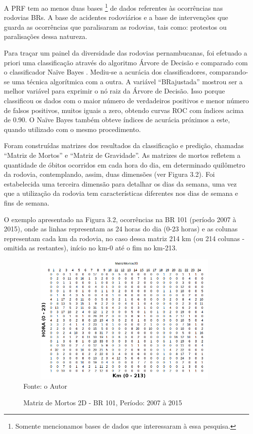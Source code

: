 A PRF tem ao menos duas bases \footnote{Somente mencionamos bases de dados que interessaram à essa pesquisa.} de dados referentes às ocorrências nas rodovias BRs. A base de acidentes rodoviários e a base de intervenções que guarda as ocorrências que paralisaram as rodovias, tais como: protestos ou paralisações dessa natureza.

Para traçar um painel da diversidade das rodovias pernambucanas, foi efetuado a priori uma classificação através do algoritmo Árvore de Decisão \cite{thianniwet2010classification} e comparado com o classificador Naïve Bayes \cite{de2011analysis}. Mediu-se a acurácia dos classificadores, comparando-se uma técnica algorítmica com a outra. A variável ``BRajustada'' mostrou ser a melhor variável para exprimir o nó raiz da Árvore de Decisão. Isso porque classificou os dados com o maior número de verdadeiros positivos e menor número de falsos positivos, muitos iguais a zero, obtendo curvas ROC com índices acima de 0.90. O Naïve Bayes também obteve índices de acurácia próximos a este, quando utilizado com o mesmo procedimento.

Foram construídas matrizes dos resultados da classificação e predição, chamadas ``Matriz de Mortos'' e ``Matriz de Gravidade''. As matrizes de mortos refletem a quantidade de óbitos ocorridos em cada hora do dia, em determinado quilômetro da rodovia, contemplando, assim, duas dimensões (ver Figura 3.2). Foi estabelecida uma terceira dimensão para detalhar os dias da semana, uma vez que a utilização da rodovia tem características diferentes nos dias de semana e fins de semana. 

\pagebreak

O exemplo apresentado na Figura 3.2, ocorrências na BR 101 (período 2007 à 2015), onde as linhas representam as 24 horas do dia (0-23 horas) e as colunas representam cada km da rodovia, no caso dessa matriz 214 km (ou 214 colunas - omitida as restantes), início no km-0 até o fim no km-213.

\begin{figure}[!ht]
\centering
\caption{Matriz de Mortos 2D - BR 101, Período: 2007 à 2015}
\label{fig:MatrizMortos2D}
\includegraphics[width=110mm, height=65mm]{Figuras/Metodologia/MatrizMortos2D}\\
\tiny Fonte: o Autor
\end{figure}




